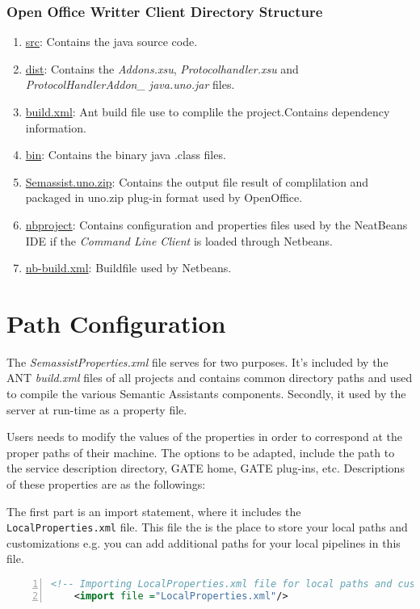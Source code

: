 \subsubsection{Open Office Writter Client Directory Structure}
\begin{enumerate}
\item \url{src}: Contains the java source code.
\item \url{dist}: Contains the \emph{Addons.xsu}, \emph{Protocolhandler.xsu} and \emph{ProtocolHandlerAddon\_ java.uno.jar} files.
\item \url{build.xml}: Ant build file use to complile the project.Contains dependency information.
\item \url{bin}: Contains the binary java .class files.
\item \url{Semassist.uno.zip}: Contains the output file result of complilation and packaged in uno.zip plug-in format used by OpenOffice.
\item \url{nbproject}: Contains configuration and properties files used by the NeatBeans IDE if the \emph{Command Line Client} is loaded through Netbeans.
\item \url{nb-build.xml}: Buildfile used by Netbeans.
\end{enumerate}

\section{Path Configuration}
The \emph{SemassistProperties.xml} file serves for two purposes.  It's
included by the ANT \emph{build.xml} files of all projects and
contains common directory paths and used to compile the various
Semantic Assistants components. Secondly, it used by the server at
run-time as a property file.

Users needs to modify the values of the properties in order to
correspond at the proper paths of their machine. The options to be
adapted, include the path to the service description directory, GATE
home, GATE plug-ins, etc. Descriptions of these properties are as the
followings:

The first part is an import statement, where it includes the
\texttt{LocalProperties.xml} file. This file the is the place to store
your local paths and customizations e.g. you can add additional paths
for your local pipelines in this file.
\begin{lstlisting}[language=XML,numbers=left,xleftmargin=8mm,columns=flexible]
    <!-- Importing LocalProperties.xml file for local paths and customizations -->
    <import file ="LocalProperties.xml"/>
\end{lstlisting}

